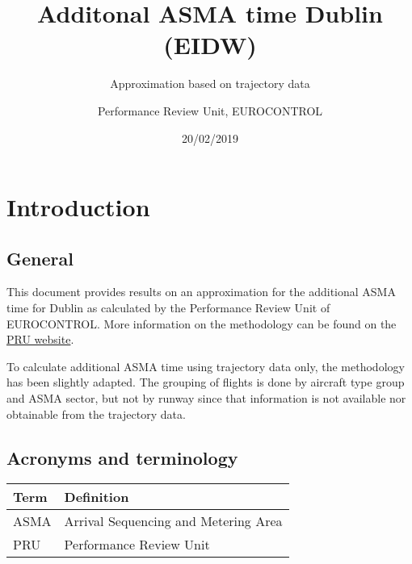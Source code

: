 \documentclass[]{article}
\title{Additonal ASMA time Dublin (EIDW)}
\subtitle{Approximation based on trajectory data}
\author{Performance Review Unit, EUROCONTROL}
\date{20/02/2019}
\begin{document}
\maketitle

\section{Introduction}\label{introduction}

\subsection{General}\label{general}

This document provides results on an approximation for the additional
ASMA time for Dublin as calculated by the Performance Review Unit of
EUROCONTROL. More information on the methodology can be found on the
\href{http://http://ansperformance.eu/references/methodology/additional_asma_time_pi.html}{PRU
website}.

To calculate additional ASMA time using trajectory data only, the
methodology has been slightly adapted. The grouping of flights is done
by aircraft type group and ASMA sector, but not by runway since that
information is not available nor obtainable from the trajectory data.

\subsection{Acronyms and terminology}\label{acronyms-and-terminology}

\begin{longtable}[]{@{}ll@{}}
\toprule
\begin{minipage}[b]{0.09\columnwidth}\raggedright\strut
Term\strut
\end{minipage} & \begin{minipage}[b]{0.33\columnwidth}\raggedright\strut
Definition\strut
\end{minipage}\tabularnewline
\midrule
\endhead
\begin{minipage}[t]{0.09\columnwidth}\raggedright\strut
ASMA\strut
\end{minipage} & \begin{minipage}[t]{0.33\columnwidth}\raggedright\strut
Arrival Sequencing and Metering Area\strut
\end{minipage}\tabularnewline
\begin{minipage}[t]{0.09\columnwidth}\raggedright\strut
PRU\strut
\end{minipage} & \begin{minipage}[t]{0.33\columnwidth}\raggedright\strut
Performance Review Unit\strut
\end{minipage}\tabularnewline
\bottomrule
\end{longtable}
\end{document}
